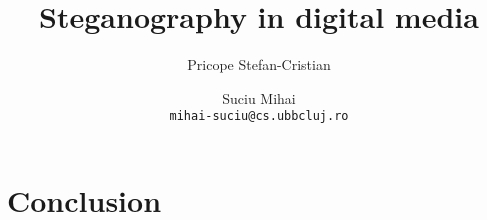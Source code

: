 \documentclass{article}
\begin{document}
\title{Steganography in digital media}

\author{
	Pricope Stefan-Cristian
  	\and
  	Suciu Mihai\\
  	\texttt{mihai-suciu@cs.ubbcluj.ro}
}
\date{\vspace{-5ex}}
\maketitle









\section{Conclusion}

\end{document}
